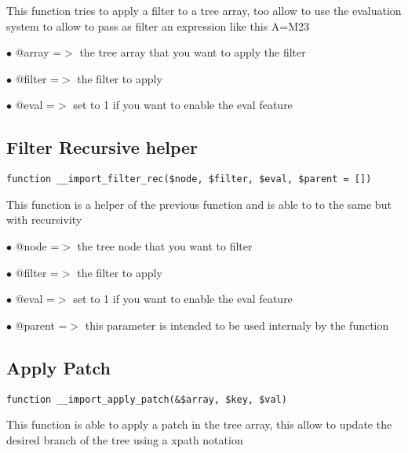 \documentclass[a4paper]{book}
\begin{document}
This function tries to apply a filter to a tree array, too allow to use
the evaluation system to allow to pass as filter an expression like this
A=M23

\begin{compactitem}
\item[\color{myblue}$\bullet$] @array  =$>$ the tree array that you want to apply the filter
\item[\color{myblue}$\bullet$] @filter =$>$ the filter to apply
\item[\color{myblue}$\bullet$] @eval   =$>$ set to 1 if you want to enable the eval feature
\end{compactitem}

\hypertarget{toc171}{}
\subsection{Filter Recursive helper}

\begin{lstlisting}
function __import_filter_rec($node, $filter, $eval, $parent = [])
\end{lstlisting}

This function is a helper of the previous function and is able to to the
same but with recursivity

\begin{compactitem}
\item[\color{myblue}$\bullet$] @node   =$>$ the tree node that you want to filter
\item[\color{myblue}$\bullet$] @filter =$>$ the filter to apply
\item[\color{myblue}$\bullet$] @eval   =$>$ set to 1 if you want to enable the eval feature
\item[\color{myblue}$\bullet$] @parent =$>$ this parameter is intended to be used internaly by the function
\end{compactitem}

\hypertarget{toc172}{}
\subsection{Apply Patch}

\begin{lstlisting}
function __import_apply_patch(&$array, $key, $val)
\end{lstlisting}

This function is able to apply a patch in the tree array, this allow to
update the desired branch of the tree using a xpath notation
\end{document}
